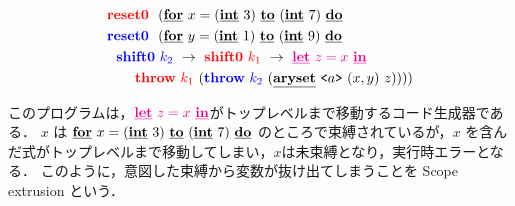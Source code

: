\begin{align*}
  &\red{\Resetz} ~~(\cforin{x=(\cint~3)}{(\cint~7)} \\
  &\blue{\Resetz} ~~(\cforin{y=(\cint~1)}{(\cint~9)} \\
  &~~\blue{\Shiftz}~\blue{k_2}~\to~ \red{\Shiftz}~\red{k_1}~\to~ \magenta{\cLet~z=x~\cIn} \\
  &~~~~~~
    \red{\Throw}~\red{k_1}~(\blue{\Throw}~\blue{k_2}~(\caryset{\code{a}}{(x,y)}{z}))))
\end{align*}

このプログラムは，$\magenta{\cLet~z=x~\cIn}$がトップレベルまで移動するコード生成器である．
$x$ は $\cforin{x=(\cint~3)}{(\cint~7)}$ のところで束縛されているが，$x$ を含んだ式がトップレベルまで移動してしまい，$x$は未束縛となり，実行時エラーとなる．
このように，意図した束縛から変数が抜け出てしまうことを Scope extrusion という．

